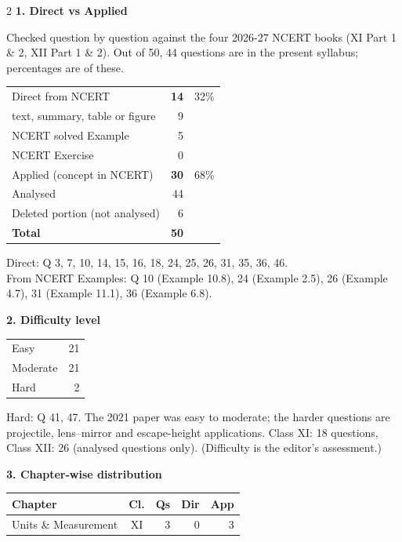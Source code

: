 \begin{multicols}{2}
\textbf{\color{crimson}1. Direct vs Applied}\par\smallskip
{\footnotesize Checked question by question against the four 2026-27 NCERT books (XI Part 1 \& 2, XII Part 1 \& 2). Out of 50, 44 questions are in the present syllabus; percentages are of these.}\par\smallskip
\begin{tabular}{@{}lrr@{}}\toprule
Direct from NCERT & \textbf{14} & 32\%\\
\quad text, summary, table or figure & 9 &\\
\quad NCERT solved Example & 5 &\\
\quad NCERT Exercise & 0 &\\
Applied (concept in NCERT) & \textbf{30} & 68\%\\\midrule
Analysed & 44 &\\
Deleted portion (not analysed) & 6 &\\\midrule
\textbf{Total} & \textbf{50} &\\\bottomrule\end{tabular}\par\smallskip
{\footnotesize Direct: Q 3, 7, 10, 14, 15, 16, 18, 24, 25, 26, 31, 35, 36, 46.\\ From NCERT Examples: Q 10 (Example 10.8), 24 (Example 2.5), 26 (Example 4.7), 31 (Example 11.1), 36 (Example 6.8).}\par\medskip
\textbf{\color{crimson}2. Difficulty level}\par\smallskip
\begin{tabular}{@{}lr@{}}\toprule
Easy & 21\\ Moderate & 21\\ Hard & 2\\\bottomrule\end{tabular}\par\smallskip
{\footnotesize Hard: Q 41, 47. The 2021 paper was easy to moderate; the harder questions are projectile, lens--mirror and escape-height applications. Class XI: 18 questions, Class XII: 26 (analysed questions only). (Difficulty is the editor's assessment.)}\par\medskip
\columnbreak
\textbf{\color{crimson}3. Chapter-wise distribution}\par\smallskip
{\footnotesize\begin{tabular}{@{}p{4.7cm}c@{\,}r@{\,}r@{\,}r@{}}\toprule
Chapter & Cl. & Qs & Dir & App\\\midrule
Units \& Measurement & XI & 3 & 0 & 3\\

\end{tabular}}
\end{multicols}
